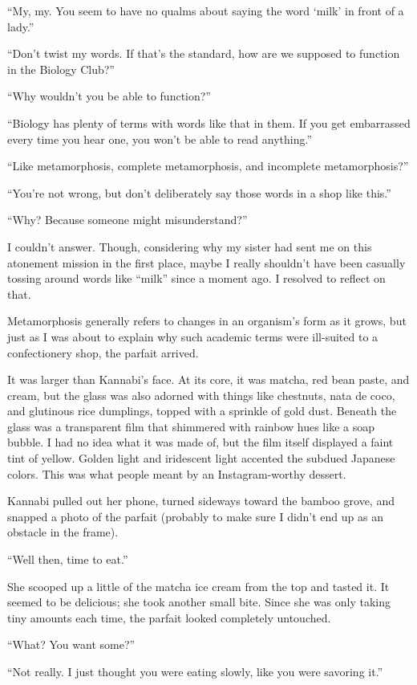 \documentclass[
    a4paper,
    12pt,
    twoside,
    openany,
    UTF8,
    fontset=windows
]{ctexbook}
\begin{document}
``My, my. You seem to have no qualms about saying the word `milk' in front of a lady.''

``Don't twist my words. If that's the standard, how are we supposed to function in the Biology Club?''

``Why wouldn't you be able to function?''

``Biology has plenty of terms with words like that in them. If you get embarrassed every time you hear one, you won't be able to read anything.''

``Like metamorphosis, complete metamorphosis, and incomplete metamorphosis?''

``You're not wrong, but don't deliberately say those words in a shop like this.''

``Why? Because someone might misunderstand?''

I couldn't answer. Though, considering why my sister had sent me on this atonement mission in the first place, maybe I really shouldn't have been casually tossing around words like ``milk'' since a moment ago. I resolved to reflect on that.

Metamorphosis generally refers to changes in an organism's form as it grows, but just as I was about to explain why such academic terms were ill-suited to a confectionery shop, the parfait arrived.

It was larger than Kannabi's face. At its core, it was matcha, red bean paste, and cream, but the glass was also adorned with things like chestnuts, nata de coco, and glutinous rice dumplings, topped with a sprinkle of gold dust. Beneath the glass was a transparent film that shimmered with rainbow hues like a soap bubble. I had no idea what it was made of, but the film itself displayed a faint tint of yellow. Golden light and iridescent light accented the subdued Japanese colors. This was what people meant by an Instagram-worthy dessert.

Kannabi pulled out her phone, turned sideways toward the bamboo grove, and snapped a photo of the parfait (probably to make sure I didn't end up as an obstacle in the frame).

``Well then, time to eat.''

She scooped up a little of the matcha ice cream from the top and tasted it. It seemed to be delicious; she took another small bite. Since she was only taking tiny amounts each time, the parfait looked completely untouched.

``What? You want some?''

``Not really. I just thought you were eating slowly, like you were savoring it.''
\end{document}
